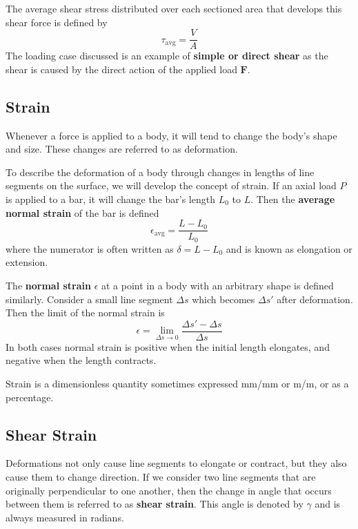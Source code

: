 \documentclass{article}
\begin{document}
The average shear stress distributed over each sectioned area that develops this shear force is
defined by
\begin{equation*}
    \tau_{\mathrm{avg}} = \frac{V}{A}
\end{equation*}
The loading case discussed is an example of \textbf{simple or direct shear} as the shear is caused
by the direct action of the applied load \(\symbf{F}\).
\subsection{Strain}
\begin{definition}[Deformation]
    Whenever a force is applied to a body, it will tend to change the body's shape and size.
    These changes are referred to as deformation.
\end{definition}
\begin{definition}[Strain]
    To describe the deformation of a body through changes in lengths of line segments on the surface,
    we will develop the concept of strain.
    If an axial load \(P\) is applied to a bar, it will change the bar's length \(L_0\) to \(L\).
    Then the \textbf{average normal strain} of the bar is defined
    \begin{equation*}
        \epsilon_{\mathrm{avg}} = \frac{L - L_0}{L_0}
    \end{equation*}
    where the numerator is often written as \(\delta = L - L_0\) and is known as elongation or extension.

    The \textbf{normal strain} \(\epsilon\) at a point in a body with an arbitrary shape is defined similarly.
    Consider a small line segment \(\Delta s\) which becomes \(\Delta s'\) after deformation. Then the limit of the normal strain
    is
    \begin{equation*}
        \epsilon = \lim_{\Delta s \to 0} \frac{\Delta s' - \Delta s}{\Delta s}
    \end{equation*}
    In both cases normal strain is positive when the initial length elongates, and negative when the length contracts.

    Strain is a dimensionless quantity sometimes expressed \unit{mm/mm} or \unit{m/m}, or as a percentage.
\end{definition}
\subsection{Shear Strain}
Deformations not only cause line segments to elongate or contract, but they also cause them to change direction.
If we consider two line segments that are originally perpendicular to one another, then the
change in angle that occurs between them is referred to as \textbf{shear strain}.
This angle is denoted by \(\gamma\) and is always measured in radians.
\end{document}
